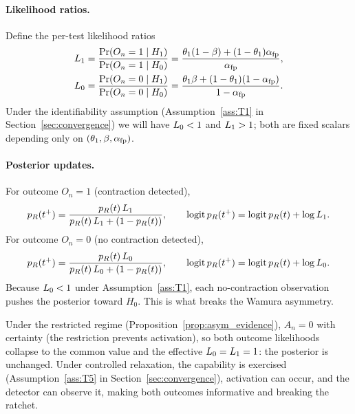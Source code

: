 \paragraph{Likelihood ratios.}
Define the per-test likelihood ratios
\begin{align}
\label{eq:L_defs}
L_1 &= \frac{\Pr(O_n = 1 \mid H_1)}{\Pr(O_n = 1 \mid H_0)}
   = \frac{\theta_1 (1 - \beta) + (1 - \theta_1) \alpha_{\mathrm{fp}}}{\alpha_{\mathrm{fp}}},\\
L_0 &= \frac{\Pr(O_n = 0 \mid H_1)}{\Pr(O_n = 0 \mid H_0)}
   = \frac{\theta_1 \beta + (1 - \theta_1) (1 - \alpha_{\mathrm{fp}})}{1 - \alpha_{\mathrm{fp}}}.
\nonumber
\end{align}
Under the identifiability assumption
(Assumption~\ref{ass:T1} in Section~\ref{sec:convergence}) we will
have $L_0 < 1$ and $L_1 > 1$; both are fixed scalars
depending only on $(\theta_1, \beta, \alpha_{\mathrm{fp}})$.

\paragraph{Posterior updates.}
For outcome $O_n = 1$ (contraction detected),
\begin{equation}
\label{eq:update_pos}
p_R(t^+) = \frac{p_R(t) \, L_1}{p_R(t) \, L_1 + (1 - p_R(t))},
\qquad
\operatorname{logit} p_R(t^+) = \operatorname{logit} p_R(t) + \log L_1.
\end{equation}
For outcome $O_n = 0$ (no contraction detected),
\begin{equation}
\label{eq:update_neg}
p_R(t^+) = \frac{p_R(t) \, L_0}{p_R(t) \, L_0 + (1 - p_R(t))},
\qquad
\operatorname{logit} p_R(t^+) = \operatorname{logit} p_R(t) + \log L_0.
\end{equation}
Because $L_0 < 1$ under Assumption~\ref{ass:T1}, each
no-contraction observation pushes the posterior toward $H_0$.
This is what breaks the Wamura asymmetry.

\begin{remark}
\label{rem:regime_contrast}
Under the restricted regime
(Proposition~\ref{prop:asym_evidence}), $A_n = 0$ with certainty
(the restriction prevents activation), so both outcome likelihoods
collapse to the common value and the effective $L_0 = L_1 =
1$: the posterior is unchanged.  Under controlled relaxation, the
capability is exercised (Assumption~\ref{ass:T5} in
Section~\ref{sec:convergence}), activation can occur, and the
detector can observe it, making both outcomes informative and
breaking the ratchet.
\end{remark}

